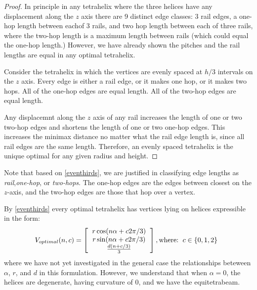 \documentclass[11pt]{article}
\begin{document}
 \begin{proof}

   In principle in any tetrahelix where the three helices have any displacement along the $z$ axis there are 9 distinct edge classes:
   3 rail edges, a one-hop length between eachof 3 rails, and two hop length between each of three rails, where the two-hop length is a maximum
   length between rails (which could equal the one-hop length.) However, we have already shown the pitches and the rail lengths are equal
   in any optimal tetrahelix.
   
    Consider the tetrahelix in which the vertices  are evenly spaced at $h/3$ intervals on the $z$ axis. Every edge is either a rail edge, or it makes one
    hop, or it makes two hops. All of the one-hop edges are equal length.  All of the two-hop edges are equal length.
    
    Any displacemnt along the $z$ axis of any rail increases the length of one or two two-hop edges and shortens the length of one or two one-hop edges.
    This increases the minimax distance no matter what the rail edge length is, since all rail edges are the same length. Therefore, an evenly spaced
    tetrahelix is the unique optimal for any given radius and height.
  \end{proof}
  

Note that based on \ref{eventhirds}, we are justified in classifying edge lengths as \emph{rail},\emph{one-hop}, or
\emph{two-hops}. The one-hop edges are the edges between closest on the $z$-axis, and the two-hop edges are those that hop over a vertex.

By \ref{eventhirds} every optimal tetrahelix has vertices lying on helices expressible in the form:
\[
V_{optimal}(n,c) =
\left [
  \begin{tabular}{c}
   $ r \cos(n \alpha +  c 2 \pi /3)$\\
   $ r \sin(n \alpha +  c 2 \pi /3) $\\
   $ \frac{d(n +c / 3)}{3}   $
  \end{tabular}
  \right ],
\text{where:}
\begin{tabular}{c}
  $c \in \{0,1,2\}$
  \end{tabular}      
\]
where we have not yet investigated in the general case the relationships beteween $\alpha$, $r$, and $d$ in this formulation.
However, we understand that when $\alpha = 0$, the helices are degenerate, having curvature of $0$, and
we have the equitetrabeam.
\end{document}
